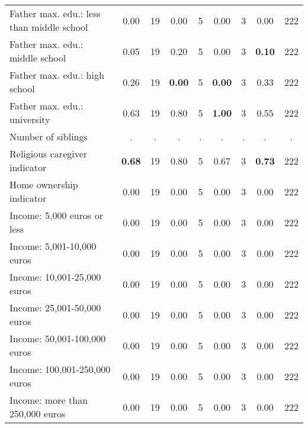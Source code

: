 \begin{tabular}{l c c c c c c c c}
Father max. edu.: less than middle school &      0.00 &        19 &      0.00 &         5 &      0.00 &         3 &      0.00 &       222 \\
Father max. edu.: middle school &      0.05 &        19 &      0.20 &         5 &      0.00 &         3 & \textbf{     0.10} &       222 \\
Father max. edu.: high school &      0.26 &        19 & \textbf{     0.00} &         5 & \textbf{     0.00} &         3 &      0.33 &       222 \\
Father max. edu.: university &      0.63 &        19 &      0.80 &         5 & \textbf{     1.00} &         3 &      0.55 &       222 \\
Number of siblings &         . & . &         . & . &         . & . &         . & . \\
Religious caregiver indicator & \textbf{     0.68} &        19 &      0.80 &         5 &      0.67 &         3 & \textbf{     0.73} &       222 \\
Home ownership indicator &      0.00 &        19 &      0.00 &         5 &      0.00 &         3 &      0.00 &       222 \\
Income: 5,000 euros or less &      0.00 &        19 &      0.00 &         5 &      0.00 &         3 &      0.00 &       222 \\
Income: 5,001-10,000 euros &      0.00 &        19 &      0.00 &         5 &      0.00 &         3 &      0.00 &       222 \\
Income: 10,001-25,000 euros &      0.00 &        19 &      0.00 &         5 &      0.00 &         3 &      0.00 &       222 \\
Income: 25,001-50,000 euros &      0.00 &        19 &      0.00 &         5 &      0.00 &         3 &      0.00 &       222 \\
Income: 50,001-100,000 euros &      0.00 &        19 &      0.00 &         5 &      0.00 &         3 &      0.00 &       222 \\
Income: 100,001-250,000 euros &      0.00 &        19 &      0.00 &         5 &      0.00 &         3 &      0.00 &       222 \\
Income: more than 250,000 euros &      0.00 &        19 &      0.00 &         5 &      0.00 &         3 &      0.00 &       222 \\
\bottomrule
\end{tabular}
